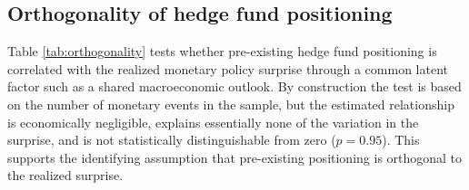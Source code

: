 \documentclass[english, 11pt, oneside]{article}
\begin{document}
\begin{table}[h!]
\label{tab:placebo}
\caption*{\textit{Notes:} This table reports placebo tests where monetary policy shocks are shifted to break the causal timing. The dependent variable is the daily change in bond yield (bps). \textit{HF Involved} indicates the presence of offshore hedge fund repo activity. \textit{Log HF Intensity} is the natural log of one plus pre-period hedge fund intensity. Column (1) corresponds to Column (4) in Table \ref{tab:baseline}, Column (2) to Column (4) in Table \ref{tab:intensity}, and Columns (3) and (4) to Columns (1) and (2) in Table \ref{tab:asymmetry}. The Shock main effect is not absorbed by fixed effects in this specification as the placebo shock does not coincide with the benchmark date cells. Standard errors are clustered by date and bond and reported in parentheses. *** p$<$0.01, ** p$<$0.05, * p$<$0.10. \\ Sample period: 2021-01-01 -- 2025-11-01}
\end{table}


\clearpage
\subsection{Orthogonality of hedge fund positioning}
\label{subsec:orthogonality}

Table \ref{tab:orthogonality} tests whether pre-existing hedge fund positioning is correlated with the realized monetary policy surprise through a common latent factor such as a shared macroeconomic outlook. By construction the test is based on the number of monetary events in the sample, but the estimated relationship is economically negligible, explains essentially none of the variation in the surprise, and is not statistically distinguishable from zero ($p = 0.95$). This supports the identifying assumption that pre-existing positioning is orthogonal to the realized surprise.
\end{document}
